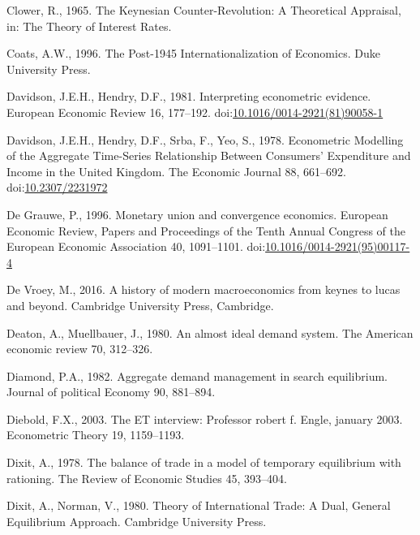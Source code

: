 \documentclass[
  12pt,
  onecolumn]{article}
\newlength{\cslhangindent}
\newlength{\cslentryspacingunit} %
\newenvironment{CSLReferences}[2] %
 {%
  \setlength{\parindent}{0pt}
  \ifodd #1
  \let\oldpar\par
  \def\par{\hangindent=\cslhangindent\oldpar}
  \fi
  \setlength{\parskip}{#2\cslentryspacingunit}
 }%
 {}
\begin{document}
\begin{CSLReferences}{1}{0}
\leavevmode{}%
Clower, R., 1965. The {Keynesian Counter-Revolution}: {A Theoretical
Appraisal}, in: The {Theory} of {Interest Rates}.

\leavevmode{}%
Coats, A.W., 1996. The Post-1945 Internationalization of Economics. Duke
University Press.

\leavevmode{}%
Davidson, J.E.H., Hendry, D.F., 1981. Interpreting econometric evidence.
European Economic Review 16, 177--192.
doi:\href{https://doi.org/10.1016/0014-2921(81)90058-1}{10.1016/0014-2921(81)90058-1}

\leavevmode{}%
Davidson, J.E.H., Hendry, D.F., Srba, F., Yeo, S., 1978. Econometric
{Modelling} of the {Aggregate Time-Series Relationship Between
Consumers}' {Expenditure} and {Income} in the {United Kingdom}. The
Economic Journal 88, 661--692.
doi:\href{https://doi.org/10.2307/2231972}{10.2307/2231972}

\leavevmode{}%
De Grauwe, P., 1996. Monetary union and convergence economics. European
Economic Review, Papers and {Proceedings} of the {Tenth Annual Congress}
of the {European Economic Association} 40, 1091--1101.
doi:\href{https://doi.org/10.1016/0014-2921(95)00117-4}{10.1016/0014-2921(95)00117-4}

\leavevmode{}%
De Vroey, M., 2016. A history of modern macroeconomics from keynes to
lucas and beyond. Cambridge University Press, Cambridge.

\leavevmode{}%
Deaton, A., Muellbauer, J., 1980. An almost ideal demand system. The
American economic review 70, 312--326.

\leavevmode{}%
Diamond, P.A., 1982. Aggregate demand management in search equilibrium.
Journal of political Economy 90, 881--894.

\leavevmode{}%
Diebold, F.X., 2003. The {ET} interview: {Professor} robert f. Engle,
january 2003. Econometric Theory 19, 1159--1193.

\leavevmode{}%
Dixit, A., 1978. The balance of trade in a model of temporary
equilibrium with rationing. The Review of Economic Studies 45, 393--404.

\leavevmode{}%
Dixit, A., Norman, V., 1980. Theory of {International Trade}: {A Dual},
{General Equilibrium Approach}. {Cambridge University Press}.


\end{CSLReferences}
\end{document}
